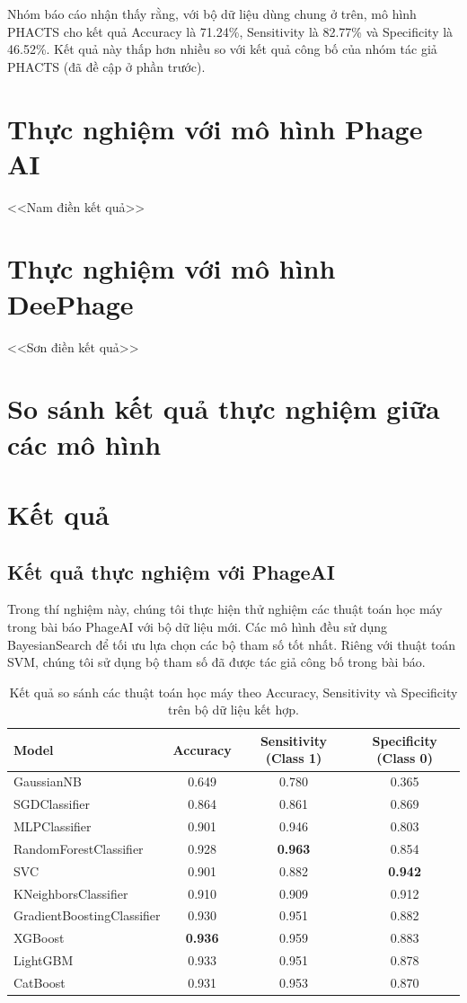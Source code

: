Nhóm báo cáo nhận thấy rằng, với bộ dữ liệu dùng chung ở trên, mô hình PHACTS cho kết quả Accuracy là 71.24\%, Sensitivity là 82.77\% và Specificity là 46.52\%. Kết quả này thấp hơn nhiều so với kết quả công bố của nhóm tác giả PHACTS (đã đề cập ở phần trước).

\section{Thực nghiệm với mô hình Phage AI}
<<Nam điền kết quả>>

\section{Thực nghiệm với mô hình DeePhage}
<<Sơn điền kết quả>>

\section{So sánh kết quả thực nghiệm giữa các mô hình}



\section{Kết quả}
\subsection{Kết quả thực nghiệm với PhageAI}
Trong thí nghiệm này, chúng tôi thực hiện thử nghiệm các thuật toán học máy trong bài báo PhageAI với bộ dữ liệu mới. Các mô hình đều sử dụng BayesianSearch để tối ưu lựa chọn các bộ tham số tốt nhất. Riêng với thuật toán SVM, chúng tôi sử dụng bộ tham số đã được tác giả công bố trong bài báo.
\begin{table}[ht]
\footnotesize
\centering
\begin{tabular}{|l|c|c|c|}
\hline
\textbf{Model} & \textbf{Accuracy} & \textbf{Sensitivity (Class 1)} & \textbf{Specificity (Class 0)} \\
\hline
GaussianNB & 0.649 & 0.780 & 0.365 \\
SGDClassifier & 0.864 & 0.861 & 0.869 \\
MLPClassifier & 0.901 & 0.946 & 0.803 \\
RandomForestClassifier & 0.928 & \textbf{0.963} & 0.854 \\
SVC & 0.901 & 0.882 & \textbf{0.942} \\
KNeighborsClassifier & 0.910 & 0.909 & 0.912 \\
GradientBoostingClassifier & 0.930 & 0.951 & 0.882 \\
XGBoost & \textbf{0.936} & 0.959 & 0.883 \\
LightGBM & 0.933 & 0.951 & 0.878 \\
CatBoost & 0.931 & 0.953 & 0.870 \\
\hline
\end{tabular}
\caption{Kết quả so sánh các thuật toán học máy theo Accuracy, Sensitivity và Specificity trên bộ dữ liệu kết hợp.}
\label{tab:model_comparison}
\end{table}

